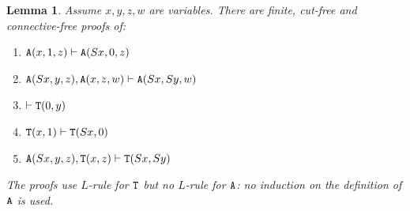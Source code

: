 \documentclass[a4paper,12pt]{article}
\newtheorem{lemma}[theorem]{Lemma}
\newcommand{\Tot}           { {\tt T} }
\newcommand{\Ack}   {{\tt A}}
\begin{document}
\begin{lemma}
\label{lemma-ackermann-base}
Assume $x,y,z,w$ are variables.
There are \emph{finite, cut-free and connective-free} proofs of:
\begin{enumerate}
\item
\label{lemma-ackermann-base-1}
$\Ack(x,1,z) \vdash \Ack(Sx,0,z)$

\item 
\label{lemma-ackermann-base-2}
$\Ack(Sx,y,z), \Ack(x,z,w) \vdash \Ack(Sx,Sy,w)$

\item
\label{lemma-ackermann-base-3}
$\vdash \Tot(0,y)$

\item 
\label{lemma-ackermann-base-4}
$\Tot(x,1) \vdash \Tot(Sx,0)$

\item 
\label{lemma-ackermann-base-5}
$\Ack(Sx,y,z), \Tot(x,z) \vdash \Tot(Sx,Sy)$
\end{enumerate}
The proofs use $L$-rule for $\Tot$ but \emph{no $L$-rule for $\Ack$}:
no \emph{induction on the definition of $\Ack$} is used.
\end{lemma}
\end{document}
